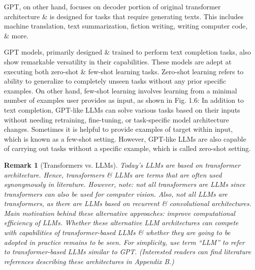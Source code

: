 \documentclass{article}
\newtheorem{remark}{Remark}
\begin{document}
\begin{itemize}
\begin{itemize}
		GPT, on other hand, focuses on decoder portion of original transformer architecture \& is designed for tasks that require generating texts. This includes machine translation, text summarization, fiction writing, writing computer code, \& more.
		
		GPT models, primarily designed \& trained to perform text completion tasks, also show remarkable versatility in their capabilities. These models are adept at executing both zero-shot \& few-shot learning tasks. Zero-shot learning refers to ability to generalize to completely unseen tasks without any prior specific examples. On other hand, few-shot learning involves learning from a minimal number of examples user provides as input, as shown in {\sf Fig. 1.6: In addition to text completion, GPT-like LLMs can solve various tasks based on their inputs without needing retraining, fine-tuning, or task-specific model architecture changes. Sometimes it is helpful to provide examples of target within input, which is known as a few-shot setting. However, GPT-like LLMs are also capable of carrying out tasks without a specific example, which is called zero-shot setting.}
		
		\begin{remark}[Transformers vs. LLMs]
			Today's LLMs are based on transformer architecture. Hence, transformers \& LLMs are terms that are often used synonymously in literature. However, note: not all transformers are LLMs since transformers can also be used for computer vision. Also, not all LLMs are transformers, as there are LLMs based on recurrent \& convolutional architectures. Main motivation behind these alternative approaches: improve computational efficiency of LLMs. Whether these alternative LLM architectures can compete with capabilities of transformer-based LLMs \& whether they are going to be adopted in practice remains to be seen. For simplicity, use term ``LLM'' to refer to transformer-based LLMs similar to GPT. (Interested readers can find literature references describing these architectures in Appendix B.)
			

\end{remark}
\end{itemize}
\end{itemize}
\end{document}
